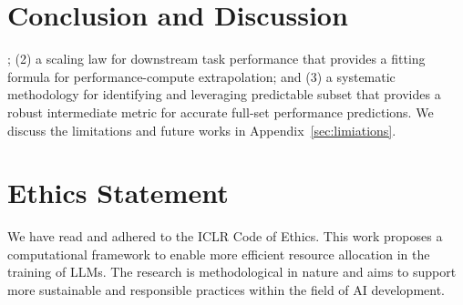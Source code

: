 \vspace{-5pt}
\section{Conclusion and Discussion}
\vspace{-7pt}
\label{sec:discussion}
; (2) a scaling law for downstream task performance that provides a fitting formula for performance-compute extrapolation; and (3) a systematic methodology for identifying and leveraging predictable subset that provides a robust intermediate metric for accurate full-set performance predictions.
We discuss the limitations and future works in Appendix~\ref{sec:limiations}.


\section*{Ethics Statement}
\label{sec:social_impact}
We have read and adhered to the ICLR Code of Ethics. This work proposes a computational framework to enable more efficient resource allocation in the training of LLMs. The research is methodological in nature and aims to support more sustainable and responsible practices within the field of AI development.

